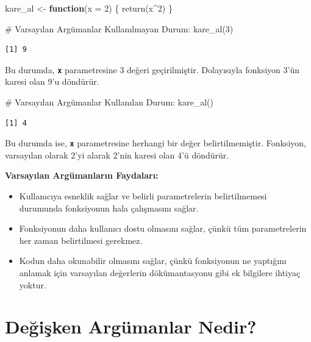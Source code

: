 \documentclass[
  letterpaper,
  DIV=11,
  numbers=noendperiod]{scrreprt}
\newenvironment{Shaded}{\begin{snugshade}}{\end{snugshade}}
\newcommand{\AttributeTok}[1]{\textcolor[rgb]{0.40,0.45,0.13}{#1}}
\newcommand{\CommentTok}[1]{\textcolor[rgb]{0.37,0.37,0.37}{#1}}
\newcommand{\ControlFlowTok}[1]{\textcolor[rgb]{0.00,0.23,0.31}{\textbf{#1}}}
\newcommand{\DecValTok}[1]{\textcolor[rgb]{0.68,0.00,0.00}{#1}}
\newcommand{\FunctionTok}[1]{\textcolor[rgb]{0.28,0.35,0.67}{#1}}
\newcommand{\NormalTok}[1]{\textcolor[rgb]{0.00,0.23,0.31}{#1}}
\newcommand{\OtherTok}[1]{\textcolor[rgb]{0.00,0.23,0.31}{#1}}
\newcommand{\SpecialCharTok}[1]{\textcolor[rgb]{0.37,0.37,0.37}{#1}}
\begin{document}
\begin{Shaded}
\begin{Highlighting}[]
\NormalTok{kare\_al }\OtherTok{\textless{}{-}} \ControlFlowTok{function}\NormalTok{(}\AttributeTok{x =} \DecValTok{2}\NormalTok{) \{}
  \FunctionTok{return}\NormalTok{(x}\SpecialCharTok{\^{}}\DecValTok{2}\NormalTok{)}
\NormalTok{\}}

\CommentTok{\# Varsayılan Argümanlar Kullanılmayan Durum:}
\FunctionTok{kare\_al}\NormalTok{(}\DecValTok{3}\NormalTok{)}
\end{Highlighting}
\end{Shaded}

\begin{verbatim}
[1] 9
\end{verbatim}

Bu durumda, \textbf{\texttt{x}} parametresine 3 değeri geçirilmiştir.
Dolayısıyla fonksiyon 3'ün karesi olan 9'u döndürür.

\begin{Shaded}
\begin{Highlighting}[]
\CommentTok{\# Varsayılan Argümanlar Kullanılan Durum:}
\FunctionTok{kare\_al}\NormalTok{()}
\end{Highlighting}
\end{Shaded}

\begin{verbatim}
[1] 4
\end{verbatim}

Bu durumda ise, \textbf{\texttt{x}} parametresine herhangi bir değer
belirtilmemiştir. Fonksiyon, varsayılan olarak 2'yi alarak 2'nin karesi
olan 4'ü döndürür.

\textbf{Varsayılan Argümanların Faydaları:}

\begin{itemize}
\item
  Kullanıcıya esneklik sağlar ve belirli parametrelerin belirtilmemesi
  durumunda fonksiyonun hala çalışmasını sağlar.
\item
  Fonksiyonun daha kullanıcı dostu olmasını sağlar, çünkü tüm
  parametrelerin her zaman belirtilmesi gerekmez.
\item
  Kodun daha okunabilir olmasını sağlar, çünkü fonksiyonun ne yaptığını
  anlamak için varsayılan değerlerin dökümantasyonu gibi ek bilgilere
  ihtiyaç yoktur.
\end{itemize}

\section{Değişken Argümanlar
Nedir?}\label{deux11fiux15fken-arguxfcmanlar-nedir}
\end{document}
